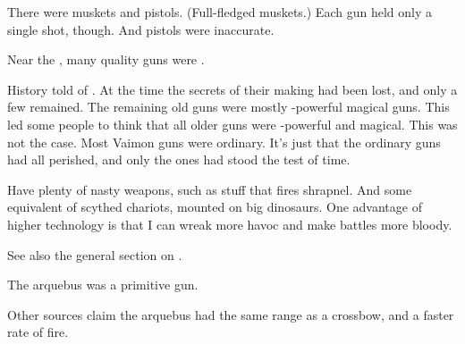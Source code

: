 There were muskets and pistols. 
(Full-fledged muskets.) 
Each gun held only a single shot, though. 
And pistols were inaccurate. 

Near the \thirdbanewar, many quality guns were . 

History told of . 
At the time the secrets of their making had been lost, and only a few remained. 
The remaining old guns were mostly \uber-powerful magical guns. 
This led some people to think that all older guns were \uber-powerful and magical. 
This was not the case. 
Most Vaimon guns were ordinary. 
It's just that the ordinary guns had all perished, and only the \uber{} ones had stood the test of time. 

Have plenty of nasty weapons, such as stuff that fires shrapnel.
And some equivalent of scythed chariots, mounted on big dinosaurs. 
One advantage of higher technology is that I can wreak more havoc and make battles more bloody. 

See also the general section on . 



\begin{gloss}
    The arquebus was a primitive gun. 
    
    Other sources claim the arquebus had the same range as a crossbow, and a faster rate of fire.
  
\end{gloss}




















